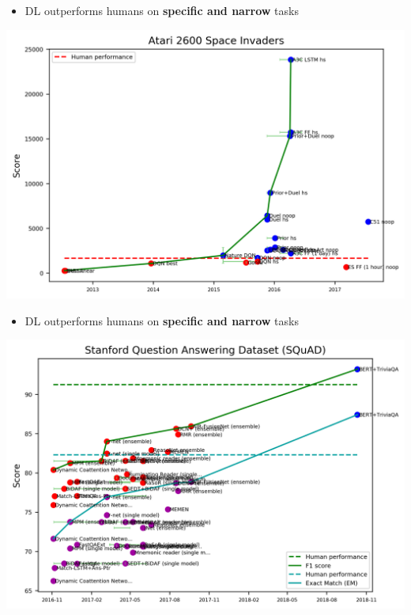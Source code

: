 \documentclass[usenames,dvipsnames]{beamer}
\begin{document}
    \begin{frame}{\secname}
        \begin{itemize}
            \item DL outperforms humans on \textbf{specific and narrow} tasks
        \end{itemize}
        \begin{center}
            \includegraphics[width=\linewidth]{figures/DL_fundamentals/space_invader_perf.png}
        \end{center}
    \end{frame}
    \begin{frame}{\secname}
        \begin{itemize}
            \item DL outperforms humans on \textbf{specific and narrow} tasks
        \end{itemize}
        \begin{center}
            \includegraphics[width=\linewidth]{figures/DL_fundamentals/stanford_QA_perf.png}
        \end{center}
    \end{frame}
\end{document}
